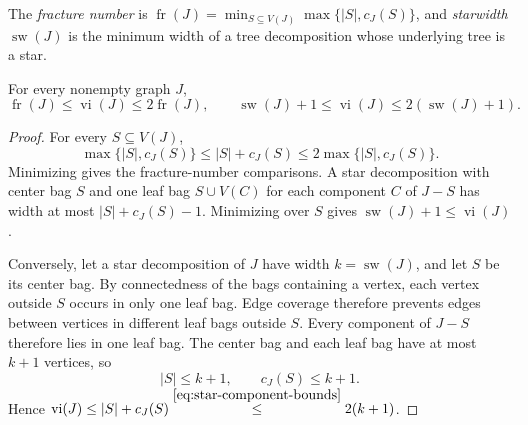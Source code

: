 The \emph{fracture number} is
$\operatorname{fr}(J)=\min_{S\subseteq V(J)}\max\{|S|,c_J(S)\}$, and
\emph{starwidth} $\operatorname{sw}(J)$ is the minimum width of
a tree decomposition whose underlying tree is a star.
\begin{lemma}
\label{lem:integrity-comparisons}
For every nonempty graph $J$,
\[
 \operatorname{fr}(J)\leq\operatorname{vi}(J)
 \leq2\operatorname{fr}(J),\qquad
 \operatorname{sw}(J)+1\leq\operatorname{vi}(J)
 \leq2(\operatorname{sw}(J)+1).
\]
\end{lemma}

\begin{proof}
For every $S\subseteq V(J)$,
\[
 \max\{|S|,c_J(S)\}\leq |S|+c_J(S)
 \leq2\max\{|S|,c_J(S)\}.
\]
Minimizing gives the fracture-number comparisons. A star decomposition
with center bag $S$ and one leaf bag $S\cup V(C)$ for each component $C$
of $J-S$ has width at most $|S|+c_J(S)-1$. Minimizing over $S$ gives
$\operatorname{sw}(J)+1\leq\operatorname{vi}(J)$.

Conversely, let a star decomposition of $J$ have width
$k=\operatorname{sw}(J)$, and let $S$ be its center bag. By connectedness of the bags containing a vertex,
each vertex outside $S$ occurs in only one leaf bag. Edge coverage
therefore prevents edges between vertices in different leaf bags
outside $S$. Every component of $J-S$ therefore lies in one leaf bag.
The center bag and each leaf bag have at most $k+1$
vertices, so
\begin{equation}\label{eq:star-component-bounds}
 |S|\leq k+1,\qquad c_J(S)\leq k+1.
\end{equation}
Hence
$\operatorname{vi}(J)\leq |S|+c_J(S)
\overset{\eqref{eq:star-component-bounds}}{\leq}2(k+1)$.
\end{proof}

